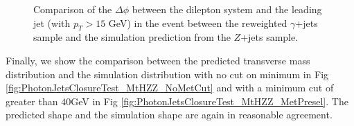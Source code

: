 \begin{figure}[!htbp]
\begin{center}
\caption{Comparison of the $\Delta\phi$ between the dilepton system and the leading jet 
(with $p_{T} > 15$ GeV) in the event between the reweighted $\gamma$+jets sample and the 
simulation prediction from the $Z$+jets sample.}
\label{fig:PhotonJetsClosureTest_DPhi}
\end{center}
\end{figure}


Finally, we show the comparison between the predicted transverse mass distribution and the simulation
distribution with no cut on minimum \met in Fig \ref{fig:PhotonJetsClosureTest_MtHZZ_NoMetCut} and 
with a minimum \met cut of greater than $40$GeV in Fig \ref{fig:PhotonJetsClosureTest_MtHZZ_MetPresel}. 
The predicted shape and the simulation shape are again in reasonable agreement. 

